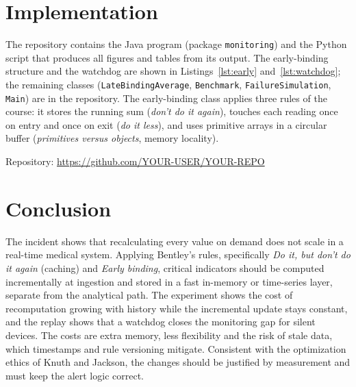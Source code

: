 \documentclass[11pt,a4paper]{article}
\begin{document}
\section{Implementation}

The repository contains the Java program (package \texttt{monitoring}) and the Python script that produces all figures and tables from its output. The early-binding structure and the watchdog are shown in Listings~\ref{lst:early} and~\ref{lst:watchdog}; the remaining classes (\texttt{LateBindingAverage}, \texttt{Benchmark}, \texttt{FailureSimulation}, \texttt{Main}) are in the repository. The early-binding class applies three rules of the course: it stores the running sum (\emph{don't do it again}), touches each reading once on entry and once on exit (\emph{do it less}), and uses primitive arrays in a circular buffer (\emph{primitives versus objects}, memory locality).





\noindent Repository: \url{https://github.com/YOUR-USER/YOUR-REPO}

\section{Conclusion}

The incident shows that recalculating every value on demand does not scale in a real-time medical system. Applying Bentley's rules, specifically \emph{Do it, but don't do it again} (caching) and \emph{Early binding}, critical indicators should be computed incrementally at ingestion and stored in a fast in-memory or time-series layer, separate from the analytical path. The experiment shows the cost of recomputation growing with history while the incremental update stays constant, and the replay shows that a watchdog closes the monitoring gap for silent devices. The costs are extra memory, less flexibility and the risk of stale data, which timestamps and rule versioning mitigate. Consistent with the optimization ethics of Knuth and Jackson, the changes should be justified by measurement and must keep the alert logic correct.



\end{document}
